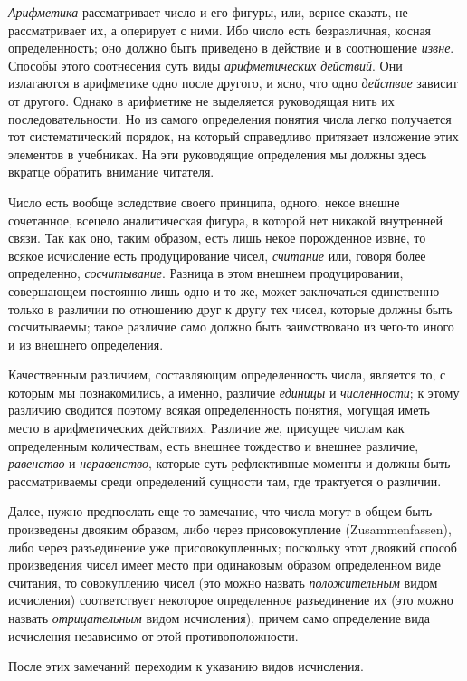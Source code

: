 {{\em Арифметика} рассматривает число и его фигуры, или,
вернее сказать, не рассматривает их, а оперирует с ними. Ибо число есть
безразличная, косная определенность; оно должно быть приведено в действие и
в соотношение {\em извне}. Способы этого соотнесения
суть виды {\em арифметических действий}. Они излагаются
в арифметике одно после другого, и ясно, что одно
{\em действие} зависит от другого. Однако в арифметике
не выделяется руководящая нить их последовательности. Но из самого
определения понятия числа легко получается тот систематический порядок, на
который справедливо притязает изложение этих элементов в учебниках. На эти
руководящие определения мы должны здесь вкратце обратить внимание читателя.

Число есть вообще вследствие своего принципа, одного, некое внешне
сочетанное, всецело аналитическая фигура, в которой нет никакой внутренней
связи. Так как оно, таким образом, есть лишь некое порожденное извне, то
всякое исчисление есть продуцирование чисел,
{\em считание} или, говоря более определенно,
{\em сосчитывание}. Разница в этом внешнем
продуцировании, совершающем постоянно лишь одно и то же, может заключаться
единственно только в различии по отношению друг к другу тех чисел, которые
должны быть сосчитываемы; такое различие само должно быть заимствовано из
чего-то иного и из внешнего определения.

Качественным различием, составляющим определенность числа, является то, с
которым мы познакомились, а именно, различие
{\em единицы} и {\em численности};
к этому различию сводится поэтому всякая определенность понятия, могущая
иметь место в арифметических действиях. Различие же, присущее числам как
определенным количествам, есть внешнее тождество и внешнее различие,
{\em равенство} и
{\em неравенство}, которые суть рефлективные моменты и
должны быть рассматриваемы среди определений сущности там, где трактуется о
различии.

Далее, нужно предпослать еще то замечание, что числа могут в общем быть
произведены двояким образом, либо через присовокупление (Zusammenfassen),
либо через разъединение уже присовокупленных; поскольку этот двоякий способ
произведения чисел имеет место при одинаковым образом определенном виде
считания, то совокуплению чисел (это можно назвать
{\em положительным} видом исчисления) соответствует
некоторое определенное разъединение их (это можно назвать
{\em отрицательным} видом исчисления), причем само
определение вида исчисления независимо от этой противоположности.

После этих замечаний переходим к указанию видов исчисления.

}
